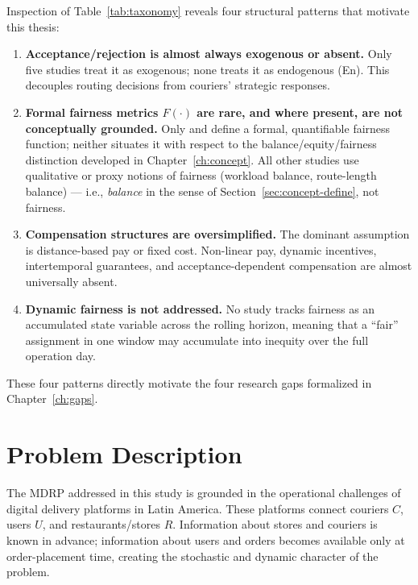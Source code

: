 \documentclass[12pt,a4paper]{report}
\begin{document}
\noindent
Inspection of Table~\ref{tab:taxonomy} reveals four structural patterns that motivate this thesis:
\begin{enumerate}[label=\textbf{P\arabic*.}]
    \item \textbf{Acceptance/rejection is almost always exogenous or absent.} Only five studies treat it as exogenous; none treats it as endogenous (En). This decouples routing decisions from couriers' strategic responses.

    \item \textbf{Formal fairness metrics $F(\cdot)$ are rare, and where present, are not conceptually grounded.} Only \citet{lesmana2019balancing} and \citet{sobhanan2024equity} define a formal, quantifiable fairness function; neither situates it with respect to the balance/equity/fairness distinction developed in Chapter~\ref{ch:concept}. All other studies use qualitative or proxy notions of fairness (workload balance, route-length balance) --- i.e., \emph{balance} in the sense of Section~\ref{sec:concept-define}, not fairness.

    \item \textbf{Compensation structures are oversimplified.} The dominant assumption is distance-based pay or fixed cost. Non-linear pay, dynamic incentives, intertemporal guarantees, and acceptance-dependent compensation are almost universally absent.

    \item \textbf{Dynamic fairness is not addressed.} No study tracks fairness as an
    accumulated state variable across the rolling horizon, meaning that a ``fair'' assignment in one window may accumulate into inequity over the full operation day.
\end{enumerate}

These four patterns directly motivate the four research gaps formalized in
Chapter~\ref{ch:gaps}.


\chapter{Problem Description}
\label{ch:problem}
\label{sec:problem}

The MDRP addressed in this study is grounded in the operational challenges of digital delivery platforms in Latin America. These platforms connect couriers $C$, users $U$, and restaurants/stores $R$. Information about stores and couriers is known in advance; information about users and orders becomes available only at order-placement time, creating the stochastic and dynamic character of the problem.
\end{document}
